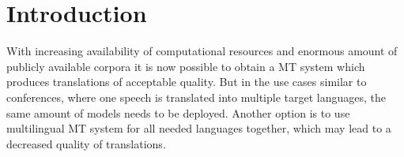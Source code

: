 \chapter*{Introduction}
With increasing availability of computational resources and enormous amount of publicly available corpora it is now possible to obtain a MT system which produces translations of acceptable quality.
But in the use cases similar to conferences, where one speech is translated into multiple target languages, the same amount of models needs to be deployed. Another option is to use multilingual MT system for all needed languages together, which may lead to a decreased quality of translations. \par

